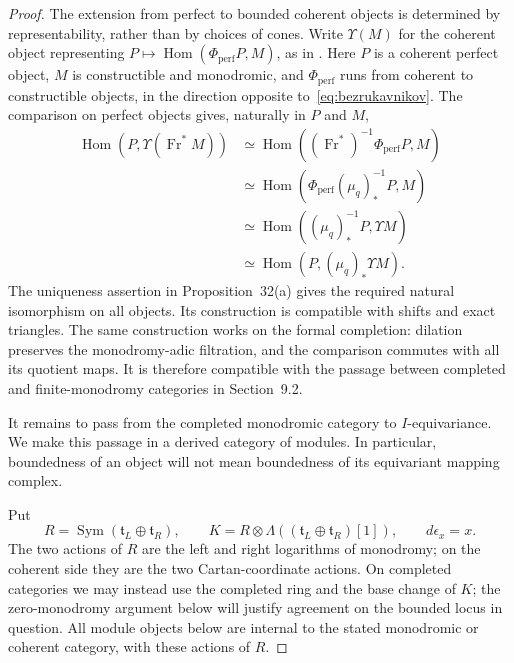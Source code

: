 \documentclass[11pt]{article}
\numberwithin{equation}{section}
\theoremstyle{definition}
\theoremstyle{remark}
\newcommand{\Fr}{\operatorname{Fr}}
\newcommand{\Hom}{\operatorname{Hom}}
\begin{document}
\begin{proof}
The extension from perfect to bounded coherent objects is determined
by representability, rather than by choices of cones.  Write
$\Upsilon(M)$ for the coherent object representing
$P\mapsto\Hom(\Phi_{\mathrm{perf}}P,M)$, as in
\cite[Proposition~32(a) and Sections~8.2--9.1]{Enh:Bezrukavnikov}.
Here $P$ is a coherent perfect object, $M$ is constructible and
monodromic, and $\Phi_{\mathrm{perf}}$ runs from coherent to
constructible objects, in the direction opposite
to~\eqref{eq:bezrukavnikov}.
The comparison on perfect objects gives, naturally in $P$ and $M$,
\begin{align*}
 \Hom(P,\Upsilon(\Fr^*M))
 &\simeq\Hom((\Fr^*)^{-1}\Phi_{\mathrm{perf}}P,M)\\
 &\simeq\Hom(\Phi_{\mathrm{perf}}(\mu_q)_*^{-1}P,M)\\
 &\simeq\Hom((\mu_q)_*^{-1}P,\Upsilon M)\\
 &\simeq\Hom(P,(\mu_q)_*\Upsilon M).
\end{align*}
The uniqueness assertion in Proposition~32(a) gives the required
natural isomorphism on all objects.  Its construction is compatible
with shifts and exact triangles.  The same construction works on
the formal completion: dilation preserves the monodromy-adic
filtration, and the comparison commutes with all its quotient maps.
It is therefore compatible with the passage between completed and
finite-monodromy categories in Section~9.2.

It remains to pass from the completed monodromic category to
$I$-equivariance.  We make this passage in a derived category of
modules.  In particular, boundedness of an object will not mean
boundedness of its equivariant mapping complex.

Put
\[
 R=\operatorname{Sym}(\mathfrak t_L\oplus\mathfrak t_R),\qquad
 K=R\otimes\Lambda((\mathfrak t_L\oplus\mathfrak t_R)[1]),
 \qquad d\epsilon_x=x.
\]
The two actions of $R$ are the left and right logarithms of
monodromy; on the coherent side they are the two Cartan-coordinate
actions.  On completed categories we may instead use the completed
ring and the base change of $K$; the zero-monodromy argument below
will justify agreement on the bounded locus in question.  All module
objects below are internal to the stated monodromic or coherent
category, with these actions of $R$.


\end{proof}
\end{document}
